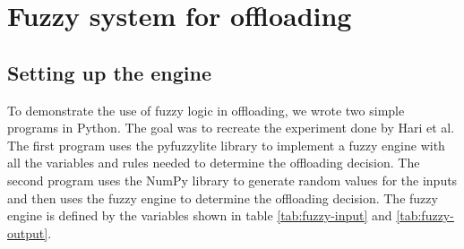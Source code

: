 \section{Fuzzy system for offloading}
\label{sec:fuzzy-offloading}

\subsection{Setting up the engine}
\label{subsec:fuzzy-setup}

To demonstrate the use of fuzzy logic in offloading, we wrote two simple programs in Python. The goal was to recreate
the experiment done by Hari et al.\cite{Hari-et-al-2018} The first program uses the pyfuzzylite\cite{fuzzylite} library
to implement a fuzzy engine with all the variables and rules needed to determine the offloading decision. The second
program uses the NumPy library to generate random values for the inputs and then uses the fuzzy engine to determine
the offloading decision. The fuzzy engine is defined by the variables shown in table \ref{tab:fuzzy-input} and
\ref{tab:fuzzy-output}.

